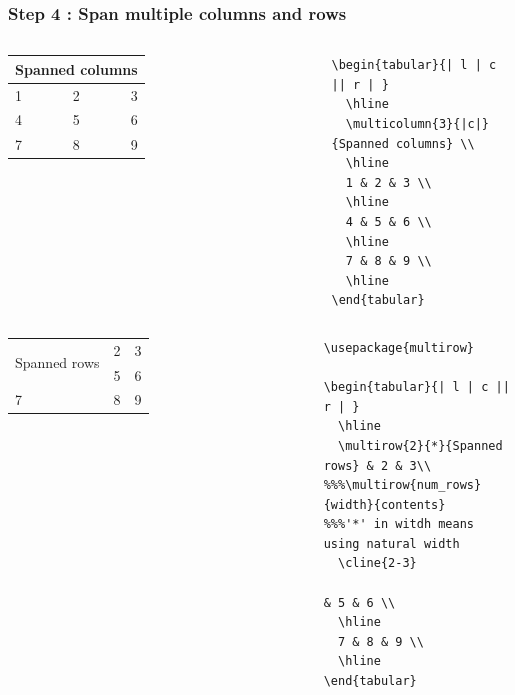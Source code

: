 \documentclass[article]{beamer}
\begin{document}
\begin{frame}[fragile]
\frametitle{Step 4 : Span multiple columns and rows }

\begin{columns}
  \begin{tabular}{| l | c || r | }
    \hline
    \multicolumn{3}{|c|}{Spanned columns} \\
    \hline
    1 & 2 & 3 \\ 
    \hline
    4 & 5 & 6 \\
    \hline 
    7 & 8 & 9 \\
    \hline
  \end{tabular}
	
\tiny{
	\begin{verbatim}
\begin{tabular}{| l | c || r | }
  \hline
  \multicolumn{3}{|c|}{Spanned columns} \\
  \hline
  1 & 2 & 3 \\ 
  \hline
  4 & 5 & 6 \\
  \hline 
  7 & 8 & 9 \\
  \hline
\end{tabular}
  \end{verbatim}
}
\end{columns}

\begin{columns}
  \begin{tabular}{| l | c || r | }
    \hline
    \multirow{2}{*}{Spanned rows} & 2 & 3\\    
    \cline{2-3}
                                  & 5 & 6 \\
    \hline 
    7 & 8 & 9 \\
    \hline
  \end{tabular}
	
\tiny{
	\begin{verbatim}
\usepackage{multirow}
	
\begin{tabular}{| l | c || r | }
  \hline
  \multirow{2}{*}{Spanned rows} & 2 & 3\\  
%%%\multirow{num_rows}{width}{contents}
%%%'*' in witdh means using natural width    
  \cline{2-3}
                                & 5 & 6 \\
  \hline 
  7 & 8 & 9 \\
  \hline
\end{tabular}
	\end{verbatim}
}
\end{columns}
	
\end{frame}
\end{document}
